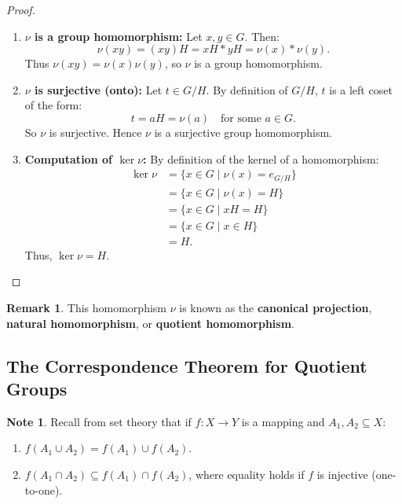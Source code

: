 \documentclass[12pt]{article}
\theoremstyle{definition}
\newtheorem*{note}{Note}
\newtheorem*{remark}{Remark}
\theoremstyle{plain}
\begin{document}
\begin{proof}
\begin{enumerate}
    \item \textbf{$\nu$ is a group homomorphism:}
    Let $x, y \in G$. Then:
    \[
    \nu(xy) = (xy)H = xH * yH = \nu(x) * \nu(y).
    \]
    Thus $\nu(xy) = \nu(x)\nu(y)$, so $\nu$ is a group homomorphism.
    
    \item \textbf{$\nu$ is surjective (onto):}
    Let $t \in G/H$. By definition of $G/H$, $t$ is a left coset of the form:
    \[
    t = aH = \nu(a) \quad \text{for some } a \in G.
    \]
    So $\nu$ is surjective. Hence $\nu$ is a surjective group homomorphism.
    
    \item \textbf{Computation of $\ker \nu$:}
    By definition of the kernel of a homomorphism:
    \begin{align*}
    \ker \nu &= \{ x \in G \mid \nu(x) = e_{G/H} \} \\
    &= \{ x \in G \mid \nu(x) = H \} \\
    &= \{ x \in G \mid xH = H \} \\
    &= \{ x \in G \mid x \in H \} \\
    &= H.
    \end{align*}
    Thus, $\ker \nu = H$.
\end{enumerate}
\end{proof}

\begin{remark}
This homomorphism $\nu$ is known as the \textbf{canonical projection}, \textbf{natural homomorphism}, or \textbf{quotient homomorphism}.
\end{remark}

\subsection{The Correspondence Theorem for Quotient Groups}

\begin{note}
Recall from set theory that if $f: X \to Y$ is a mapping and $A_1, A_2 \subseteq X$:
\begin{enumerate}
    \item $f(A_1 \cup A_2) = f(A_1) \cup f(A_2)$.
    \item $f(A_1 \cap A_2) \subseteq f(A_1) \cap f(A_2)$, where equality holds if $f$ is injective (one-to-one).
\end{enumerate}
\end{note}
\end{document}
